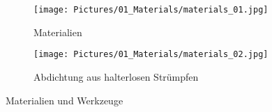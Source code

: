 \documentclass[12pt,parskip=full]{scrartcl}
\begin{document}
\begin{figure}[h]
    \vspace{0.5cm}
    \centering
    \begin{subfigure}{0.48\textwidth}
        \centering
        \texttt{[image: Pictures/01\_Materials/materials\_01.jpg]}
        \caption{Materialien}
    \end{subfigure}
    \begin{subfigure}{0.48\textwidth}
        \centering
        \texttt{[image: Pictures/01\_Materials/materials\_02.jpg]}
        \caption{Abdichtung aus halterlosen Strümpfen}
    \end{subfigure}
    \caption{Materialien und Werkzeuge}
\end{figure}
\end{document}
